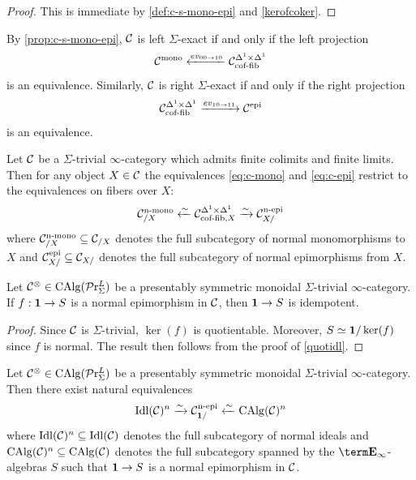 \documentclass[10pt,a4paper,oneside]{article}
\begin{document}
\begin{proof}
This is immediate by \cref{def:c-s-mono-epi} and \cref{kerofcoker}.
\end{proof}

\begin{rem}
By \cref{prop:c-s-mono-epi}, $\mathcal{C}$ is left $\Sigma$-exact if and only if the left projection
\begin{equation}\label{eq:c-mono}
\mathcal{C}^{\operatorname{mono}}\xleftarrow{ev_{00\to10}}\mathcal{C}^{\Delta^1\times\Delta^1}_{\operatorname{cof-fib}}    
\end{equation}
is an equivalence. Similarly, $\mathcal{C}$ is right $\Sigma$-exact if and only if the right projection
\begin{equation}\label{eq:c-epi}
\mathcal{C}^{\Delta^1\times\Delta^1}_{\operatorname{cof-fib}}\xrightarrow{ev_{10\to11}}\mathcal{C}^{\operatorname{epi}}
\end{equation}
is an equivalence.
\end{rem}

\begin{cor}\label{monoepiequi}
Let $\mathcal{C}$ be a $\Sigma$-trivial $\infty$-category which admits finite colimits and finite limits. Then for any object $X\in\mathcal{C}$ the equivalences \eqref{eq:c-mono} and \eqref{eq:c-epi} restrict to the equivalences on fibers over $X$:
$$\mathcal{C}_{/X}^{\operatorname{n-mono}}\xleftarrow{\sim}\mathcal{C}^{\Delta^1\times\Delta^1}_{\operatorname{cof-fib}, X}\xrightarrow{\sim}\mathcal{C}_{X/}^{\operatorname{n-epi}} $$
where  $\mathcal{C}_{/X}^{\operatorname{n-mono}}\subseteq \mathcal{C}_{/X}$ denotes the full subcategory of normal monomorphisms to $X$ and $\mathcal{C}_{X/}^{\operatorname{epi}}\subseteq \mathcal{C}_{X/}$ denotes the full subcategory of normal epimorphisms from $X$.
\end{cor}

\begin{lem}\label{epiidem}
Let $\mathcal{C}^\otimes\in\operatorname{CAlg}(\mathcal{P}\mathrm{r}^L_{\Sigma})$ be a presentably symmetric monoidal $\Sigma$-trivial $\infty$-category. If $f:\mathbf{1}\to S$ is a normal epimorphism in $\mathcal{C}$, then $\mathbf{1}\to S$ is idempotent.
\end{lem}

\begin{proof}
Since $\mathcal{C}$ is $\Sigma$-trivial, $\ker(f)$ is quotientable. Moreover, $S\simeq \mathbf{1}/\ker(f)$ since $f$ is normal. The result then follows from the proof of \cref{quotidl}.
\end{proof}

\begin{thm}\label{thm:ideal-epi-iden}
Let $\mathcal{C}^\otimes\in\operatorname{CAlg}(\mathcal{P}\mathrm{r}^L_{\Sigma})$ be a presentably symmetric monoidal $\Sigma$-trivial $\infty$-category. Then there exist natural equivalences $$\operatorname{Idl}(\mathcal{C})^n\xrightarrow{\sim}\mathcal{C}_{\mathbf{1}/}^{\operatorname{n-epi}}\xleftarrow{\sim}\operatorname{CAlg}(\mathcal{C})^n$$ where $\operatorname{Idl}(\mathcal{C})^n\subseteq \operatorname{Idl}(\mathcal{C})$ denotes the full subcategory of normal ideals and $\operatorname{CAlg}(\mathcal{C})^n\subseteq\operatorname{CAlg}(\mathcal{C})$ denotes the full subcategory spanned by the $\einf$-algebras $S$ such that $\mathbf{1}\to S$ is a normal epimorphism in $\mathcal{C}$.
\end{thm}
\end{document}

